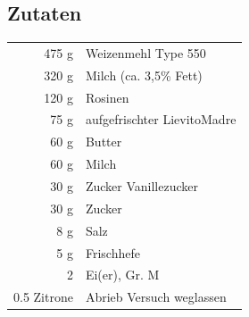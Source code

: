 %
%
\subsection*{Zutaten}
\begin{tabular}{r l}
          475 g & Weizenmehl Type 550          \\
          320 g & Milch (ca. 3,5\% Fett)       \\
          120 g & Rosinen                      \\
           75 g & aufgefrischter \Gls{LievitoMadre} \\
           60 g & Butter                       \\
           60 g & Milch                        \\
           30 g & Zucker Vanillezucker         \\
           30 g & Zucker                       \\
            8 g & Salz                         \\
            5 g & Frischhefe                   \\
              2 & Ei(er), Gr. M                \\
    0.5 Zitrone & Abrieb Versuch weglassen
\end{tabular}\\

%
%


